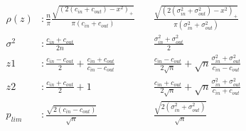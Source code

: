 \begin{align*}
	\rho (z)&: \frac{n}{\pi}\frac{\sqrt{(2(c_{in} + c_{out}) - x^2)_+}}{\pi(c_{in} + c_{out})} &\;& \frac{\sqrt{(2(\sigma_{in}^2 + \sigma_{out}^2) - x^2)_+}}{\pi(\sigma_{in}^2 + \sigma_{out}^2)}\\
	\sigma^2&: \frac{c_{in} + c_{out}}{2n} &\;& \frac{\sigma_{in}^2 + \sigma_{out}^2}{2} \\
	z1&: \frac{c_{in}-c_{out}}{2} + \frac{c_{in}+c_{out}}{c_{in}-c_{out}} &\;& \frac{c_{in}-c_{out}}{2\sqrt{n}} + \sqrt{n}\frac{\sigma_{in}^2+\sigma_{out}^2}{c_{in}-c_{out}}\\
	z2&: \frac{c_{in}+c_{out}}{2} + 1 &\;& \frac{c_{in}+c_{out}}{2\sqrt{n}} + \sqrt{n}\frac{\sigma_{in}^2+\sigma_{out}^2}{c_{in}+c_{out}}\\
	p_{lim}&: \frac{\sqrt{2(c_{in} - c_{out})}}{\sqrt{n}}&\;& \frac{\sqrt{2(\sigma_{in}^2 + \sigma_{out}^2)}}{\sqrt{n}}\\
\end{align*}


